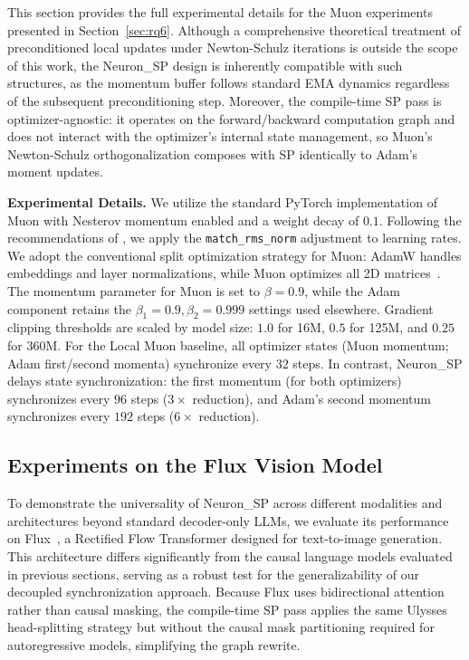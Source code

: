 \documentclass{article}
\begin{document}
This section provides the full experimental details for the Muon experiments presented in Section~\ref{sec:rq6}. Although a comprehensive theoretical treatment of preconditioned local updates under Newton-Schulz iterations is outside the scope of this work, the Neuron\_SP design is inherently compatible with such structures, as the momentum buffer follows standard EMA dynamics regardless of the subsequent preconditioning step. Moreover, the compile-time SP pass is optimizer-agnostic: it operates on the forward/backward computation graph and does not interact with the optimizer's internal state management, so Muon's Newton-Schulz orthogonalization composes with SP identically to Adam's moment updates.

\textbf{Experimental Details.} We utilize the standard PyTorch implementation of Muon with Nesterov momentum enabled and a weight decay of $0.1$. Following the recommendations of \citet{liu2025muon}, we apply the \texttt{match\_rms\_norm} adjustment to learning rates. We adopt the conventional split optimization strategy for Muon: AdamW handles embeddings and layer normalizations, while Muon optimizes all 2D matrices~\citep{jordan2024muon}. The momentum parameter for Muon is set to $\beta=0.9$, while the Adam component retains the $\beta_1=0.9, \beta_2=0.999$ settings used elsewhere. Gradient clipping thresholds are scaled by model size: $1.0$ for 16M, $0.5$ for 125M, and $0.25$ for 360M. For the Local Muon baseline, all optimizer states (Muon momentum; Adam first/second momenta) synchronize every $32$ steps. In contrast, Neuron\_SP delays state synchronization: the first momentum (for both optimizers) synchronizes every $96$ steps ($3\times$ reduction), and Adam's second momentum synchronizes every $192$ steps ($6\times$ reduction).

\subsection{Experiments on the Flux Vision Model}
\label{sec:b8_flux}

To demonstrate the universality of Neuron\_SP across different modalities and architectures beyond standard decoder-only LLMs, we evaluate its performance on Flux~\citep{labs2025flux}, a Rectified Flow Transformer designed for text-to-image generation. This architecture differs significantly from the causal language models evaluated in previous sections, serving as a robust test for the generalizability of our decoupled synchronization approach. Because Flux uses bidirectional attention rather than causal masking, the compile-time SP pass applies the same Ulysses head-splitting strategy but without the causal mask partitioning required for autoregressive models, simplifying the graph rewrite.
\end{document}
